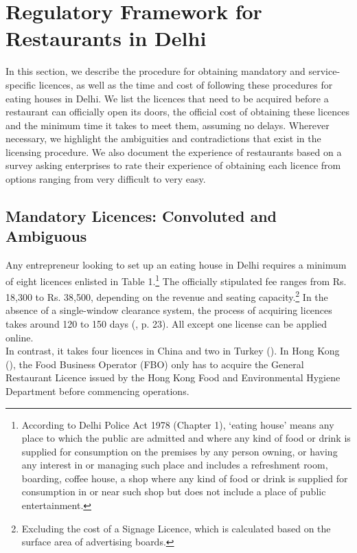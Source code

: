 \documentclass[a4paper, 12pt]{article}
\begin{document}
                                        
                    \section{Regulatory Framework for Restaurants in Delhi}
                    \label{sec:1}
                    In this section, we describe the procedure for obtaining mandatory and service-specific licences, as well as the time and cost of following these procedures for eating houses in Delhi. We list the licences that need to be acquired before a restaurant can 
officially open its doors, the official cost of obtaining these licences and the minimum time it takes to meet them, assuming no delays. Wherever necessary, we highlight the ambiguities and contradictions that exist in the licensing procedure. We also document the 
experience of restaurants based on a survey asking enterprises to rate their experience of obtaining each licence from options ranging from very difficult to very easy.
                                   
                    \subsection{Mandatory Licences: Convoluted and Ambiguous}
                     Any entrepreneur looking to set up an eating house in Delhi requires a minimum of eight licences enlisted in Table 1.\footnote{According to Delhi Police Act 1978 (Chapter 1), ‘eating house’ means any place to which the public are admitted and where 
any kind of food or drink is supplied for consumption on the premises by any person owning, or having any interest in or managing such place and includes a refreshment room, boarding, coffee house, a shop where any kind of food or drink is supplied for 
consumption in or near such shop but does not include a place of public entertainment.} The officially stipulated fee ranges from Rs. 18,300 to Rs. 38,500, depending on the revenue and seating capacity.\footnote{Excluding the cost of a Signage Licence, which is 
calculated based on the surface area of advertising boards.} In the absence of a single-window clearance system, the process of acquiring licences takes around 120 to 150 days (\cite{kpmg2016foodservindustry}, p. 23). All except one license can be applied online. \\
     
                   In contrast, it takes four licences in China and two in Turkey (\cite{et2015fbooverregn}). In Hong Kong (\cite{guidemehk}), the Food Business Operator (FBO) only has to acquire the General Restaurant Licence issued by the Hong Kong 
Food and Environmental Hygiene Department before commencing operations.
\end{document}
